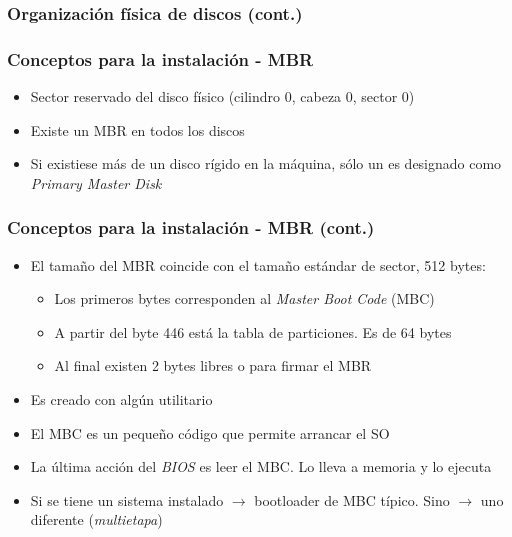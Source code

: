 \begin{frame}
	\frametitle{Organización física de discos (cont.)}
	\begin{figure}
	\end{figure}
\end{frame}

\begin{frame}
	\frametitle{Conceptos para la instalación - \textbf{MBR}}
	\begin{itemize}
		\item Sector reservado del disco físico (cilindro 0, cabeza 0, sector 0)
		\item Existe un MBR en todos los discos
		\item Si existiese más de un disco rígido en la máquina, sólo un es designado como \textit{Primary Master Disk}
	\end{itemize}
\end{frame}

\begin{frame}
	\frametitle{Conceptos para la instalación - MBR (cont.)}
	\begin{itemize}
		\item El tamaño del MBR coincide con el tamaño estándar de sector, 512 bytes:
		\begin{itemize}
			\item Los primeros bytes corresponden al \textit{Master Boot Code} (MBC)
			\item A partir del byte 446 está la tabla de particiones. Es de 64 bytes
			\item Al final existen 2 bytes libres o para firmar el MBR
		\end{itemize}
		\item Es creado con algún utilitario	
		\item El MBC es un pequeño código que permite arrancar el SO
		\item La última acción del \textit{BIOS} es leer el MBC. Lo lleva a memoria y lo ejecuta		
		\item Si se tiene un sistema instalado $\rightarrow$ bootloader de MBC típico. Sino $\rightarrow$ uno diferente (\textit{multietapa})		
	\end{itemize}
\end{frame}

